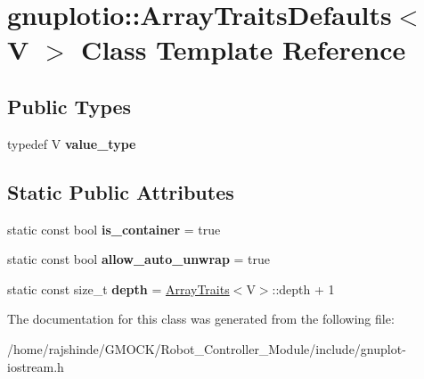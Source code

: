 \hypertarget{classgnuplotio_1_1_array_traits_defaults}{}\section{gnuplotio\+:\+:Array\+Traits\+Defaults$<$ V $>$ Class Template Reference}
\label{classgnuplotio_1_1_array_traits_defaults}
\subsection*{Public Types}
\begin{DoxyCompactItemize}
\item 
typedef V {\bfseries value\+\_\+type}\hypertarget{classgnuplotio_1_1_array_traits_defaults_ad7a9e8d19419fabe2ab9cc1b76c9965b}{}\label{classgnuplotio_1_1_array_traits_defaults_ad7a9e8d19419fabe2ab9cc1b76c9965b}

\end{DoxyCompactItemize}
\subsection*{Static Public Attributes}
\begin{DoxyCompactItemize}
\item 
static const bool {\bfseries is\+\_\+container} = true\hypertarget{classgnuplotio_1_1_array_traits_defaults_a57bab5bf3617f0ee66fdd4dcb751aa21}{}\label{classgnuplotio_1_1_array_traits_defaults_a57bab5bf3617f0ee66fdd4dcb751aa21}

\item 
static const bool {\bfseries allow\+\_\+auto\+\_\+unwrap} = true\hypertarget{classgnuplotio_1_1_array_traits_defaults_ac8d430cba6ceefc6f52706455f12a0e8}{}\label{classgnuplotio_1_1_array_traits_defaults_ac8d430cba6ceefc6f52706455f12a0e8}

\item 
static const size\+\_\+t {\bfseries depth} = \hyperlink{classgnuplotio_1_1_array_traits}{Array\+Traits}$<$V$>$\+::depth + 1\hypertarget{classgnuplotio_1_1_array_traits_defaults_ac51367f5da9096249b162af1496e36ab}{}\label{classgnuplotio_1_1_array_traits_defaults_ac51367f5da9096249b162af1496e36ab}

\end{DoxyCompactItemize}


The documentation for this class was generated from the following file\+:\begin{DoxyCompactItemize}
\item 
/home/rajshinde/\+G\+M\+O\+C\+K/\+Robot\+\_\+\+Controller\+\_\+\+Module/include/gnuplot-\/iostream.\+h\end{DoxyCompactItemize}

